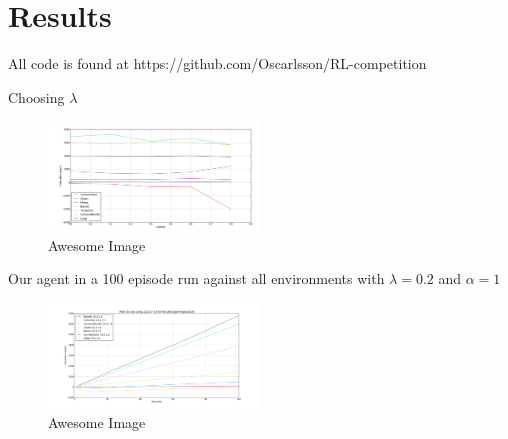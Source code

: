 \documentclass[letterpaper,twocolumn,10pt]{article}
\begin{document}
\section{Results}
All code is found at https://github.com/Oscarlsson/RL-competition

Choosing $\lambda$
\begin{figure}[h]
    \centering
    \includegraphics[width=0.5\textwidth]{../data/lambdasweepplotTEST.png}
    \caption{Awesome Image}
    \label{fig:awesome_image}
\end{figure}


Our agent in a 100 episode run against all environments with $\lambda = 0.2$ and $\alpha = 1$
\begin{figure}[h]
    \centering
    \includegraphics[width=0.5\textwidth]{../data/100episodes_50runs.png}
    \caption{Awesome Image}
    \label{fig:awesome_image}
\end{figure}

{\footnotesize 
}


\theendnotes
\end{document}
